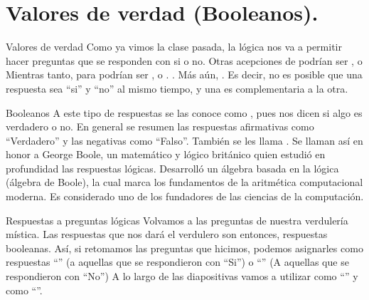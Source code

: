 
\section{Valores de verdad (Booleanos).}


\begin{frame}{Valores de verdad}
  Como ya vimos la clase pasada, la lógica nos va a permitir hacer preguntas
  que se responden con si o no.
  \jump
  Otras acepciones de  podrían ser ,
   o 
  \jump
  Mientras tanto, para  podrían ser ,
   o .
  \jump
  .
  \jump
  Más aún, . Es decir, no es posible que una
  respuesta sea ``si'' y ``no'' al mismo tiempo, y una es complementaria a la
  otra.
\end{frame}


\begin{frame}{Booleanos}
  A este tipo de respuestas se las conoce como , pues
  nos dicen si algo es verdadero o no. En general se resumen las respuestas
  afirmativas como ``Verdadero'' y las negativas como ``Falso''.
  \jump
  También se les llama . Se llaman así en honor a George Boole, un matemático y lógico británico
  quien estudió en profundidad las respuestas lógicas. Desarrolló un álgebra
  basada en la lógica (álgebra de Boole), la cual marca los fundamentos de la
  aritmética computacional moderna. Es considerado uno de los fundadores de las
  ciencias de la computación.
  \jump
\end{frame}


\begin{frame}{Respuestas a preguntas lógicas}
  Volvamos a las preguntas de nuestra verdulería mística. Las respuestas que nos
  dará el verdulero son entonces, respuestas booleanas.
  \jump
  \jump
  Así, si retomamos las preguntas que hicimos, podemos asignarles como respuestas
  ``\fulltrue'' (a aquellas que se respondieron con ``Si'') o ``\fullfalse'' (A
  aquellas que se respondieron con ``No'')
  \jump
  A lo largo de las diapositivas vamos a utilizar \true como ``\fulltrue'' y
  \false como ``\fullfalse''.
\end{frame}

